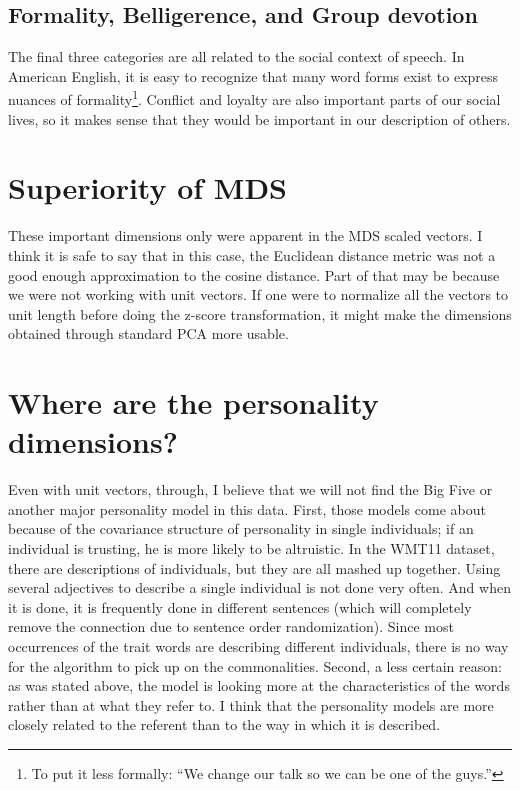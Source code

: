 \documentclass[eric_thesis.tex]{subfiles}
\begin{document}
\subsection{Formality, Belligerence, and Group devotion}

The final three categories are all related to the social context of speech. In
American English, it is easy to recognize that many word forms exist to express
nuances of formality\footnote{To put it less formally: ``We change our
talk so we can be one of the guys.''}. Conflict and loyalty are also important
parts of our social lives, so it makes sense that they would be important in
our description of others.

\section{Superiority of MDS}

These important dimensions only were apparent in the MDS scaled vectors. I think
it is safe to say that in this case, the Euclidean distance metric was not a
good enough approximation to the cosine distance. Part of that may be because
we were not working with unit vectors. If one were to normalize all the vectors 
to unit length before doing the z-score transformation, it might make the 
dimensions obtained through standard PCA more usable.

\section{Where are the personality dimensions?}

Even with unit vectors, through, I believe that we will not find the Big Five or 
another major personality model in this data. First, those models come about 
because of the covariance structure of personality in single individuals; if an 
individual is trusting, he is more likely to be altruistic. In the WMT11 
dataset, there are descriptions of individuals, but they are all mashed up 
together. Using several adjectives to describe a single individual is not done 
very often. And when it is done, it is frequently done in different sentences 
(which will completely remove the connection due to sentence order 
randomization). Since most occurrences of the trait words are describing 
different individuals, there is no way for the algorithm to pick up on the 
commonalities. Second, a less certain reason: as was stated above, the model is 
looking more at the characteristics of the words rather than at what they refer 
to. I think that the personality models are more closely related to the referent 
than to the way in which it is described.
\end{document}
